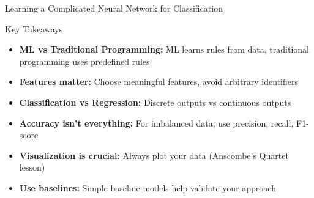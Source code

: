 \documentclass[usenames,dvipsnames]{beamer}
\begin{document}
\begin{frame}{Learning a Complicated Neural Network for Classification}
\begin{frame}{Key Takeaways}
\begin{keypointsbox}
\begin{itemize}
	\item \textbf{ML vs Traditional Programming:} ML learns rules from data, traditional programming uses predefined rules
	\item \textbf{Features matter:} Choose meaningful features, avoid arbitrary identifiers
	\item \textbf{Classification vs Regression:} Discrete outputs vs continuous outputs
	\item \textbf{Accuracy isn't everything:} For imbalanced data, use precision, recall, F1-score
	\item \textbf{Visualization is crucial:} Always plot your data (Anscombe's Quartet lesson)
	\item \textbf{Use baselines:} Simple baseline models help validate your approach
\end{itemize}
\end{keypointsbox}
\end{frame}






\end{frame}
\end{document}
